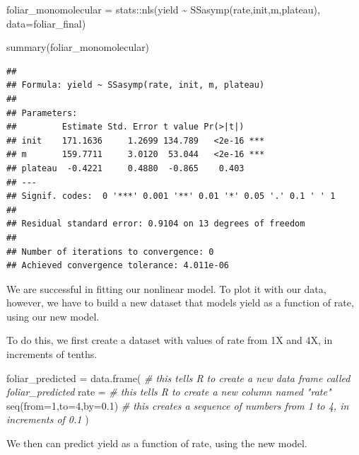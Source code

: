 \documentclass[
]{book}
\newenvironment{Shaded}{\begin{snugshade}}{\end{snugshade}}
\newcommand{\AttributeTok}[1]{\textcolor[rgb]{0.77,0.63,0.00}{#1}}
\newcommand{\CommentTok}[1]{\textcolor[rgb]{0.56,0.35,0.01}{\textit{#1}}}
\newcommand{\DecValTok}[1]{\textcolor[rgb]{0.00,0.00,0.81}{#1}}
\newcommand{\FloatTok}[1]{\textcolor[rgb]{0.00,0.00,0.81}{#1}}
\newcommand{\FunctionTok}[1]{\textcolor[rgb]{0.00,0.00,0.00}{#1}}
\newcommand{\NormalTok}[1]{#1}
\newcommand{\OtherTok}[1]{\textcolor[rgb]{0.56,0.35,0.01}{#1}}
\newcommand{\SpecialCharTok}[1]{\textcolor[rgb]{0.00,0.00,0.00}{#1}}
\begin{document}
\begin{Shaded}
\begin{Highlighting}[]
\NormalTok{foliar\_monomolecular }\OtherTok{=}\NormalTok{ stats}\SpecialCharTok{::}\FunctionTok{nls}\NormalTok{(yield }\SpecialCharTok{\textasciitilde{}} \FunctionTok{SSasymp}\NormalTok{(rate,init,m,plateau), }\AttributeTok{data=}\NormalTok{foliar\_final)}

\FunctionTok{summary}\NormalTok{(foliar\_monomolecular)}
\end{Highlighting}
\end{Shaded}

\begin{verbatim}
## 
## Formula: yield ~ SSasymp(rate, init, m, plateau)
## 
## Parameters:
##         Estimate Std. Error t value Pr(>|t|)    
## init    171.1636     1.2699 134.789   <2e-16 ***
## m       159.7711     3.0120  53.044   <2e-16 ***
## plateau  -0.4221     0.4880  -0.865    0.403    
## ---
## Signif. codes:  0 '***' 0.001 '**' 0.01 '*' 0.05 '.' 0.1 ' ' 1
## 
## Residual standard error: 0.9104 on 13 degrees of freedom
## 
## Number of iterations to convergence: 0 
## Achieved convergence tolerance: 4.011e-06
\end{verbatim}

We are successful in fitting our nonlinear model. To plot it with our data, however, we have to build a new dataset that models yield as a function of rate, using our new model.

To do this, we first create a dataset with values of rate from 1X and 4X, in increments of tenths.

\begin{Shaded}
\begin{Highlighting}[]
\NormalTok{foliar\_predicted }\OtherTok{=} \FunctionTok{data.frame}\NormalTok{(            }\CommentTok{\# this tells R to create a new data frame called foliar\_predicted }
  \AttributeTok{rate =}                                  \CommentTok{\# this tells R to create a new column named "rate"}
    \FunctionTok{seq}\NormalTok{(}\AttributeTok{from=}\DecValTok{1}\NormalTok{,}\AttributeTok{to=}\DecValTok{4}\NormalTok{,}\AttributeTok{by=}\FloatTok{0.1}\NormalTok{)               }\CommentTok{\# this creates a sequence of numbers from 1 to 4, in increments of 0.1}
\NormalTok{  )}
\end{Highlighting}
\end{Shaded}

We then can predict yield as a function of rate, using the new model.
\end{document}
